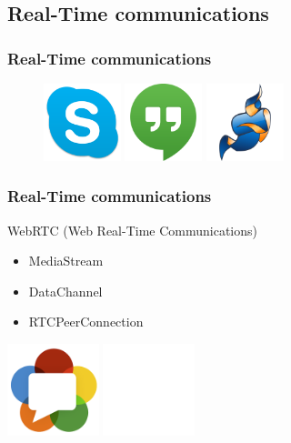 \documentclass[compress]{beamer}
\begin{document}
	\subsection{Real-Time communications}\label{rtc}


		\begin{frame}[c]
		\frametitle{Real-Time communications}
		\begin{figure}
			\includegraphics[width=0.2\textwidth]{figures/skype.png}
			\includegraphics[width=0.2\textwidth]{figures/hangouts.png}
			\includegraphics[width=0.2\textwidth]{figures/jitsi.png}
		\end{figure}
		\end{frame}

		\begin{frame}[c]
		\frametitle{Real-Time communications}

		WebRTC (Web Real-Time Communications)

		\begin{itemize}
		\item MediaStream	
		\item DataChannel
		\item RTCPeerConnection
		\end{itemize}

		\begin{flushright}

			\vspace*{-5\baselineskip}
			\includegraphics[width=0.2\textwidth]{figures/webrtc.png}
			\includegraphics[width=0.2\textwidth]{figures/space.png}
		\end{flushright}
		
		\end{frame}
\end{document}
